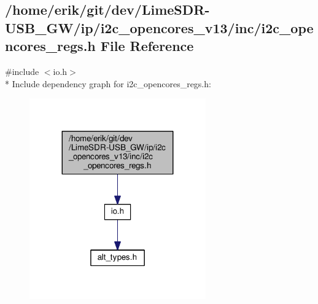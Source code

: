 \subsection{/home/erik/git/dev/\+Lime\+S\+D\+R-\/\+U\+S\+B\+\_\+\+G\+W/ip/i2c\+\_\+opencores\+\_\+v13/inc/i2c\+\_\+opencores\+\_\+regs.h File Reference}
\label{ip_2i2c__opencores__v13_2inc_2i2c__opencores__regs_8h}
{\ttfamily \#include $<$io.\+h$>$}\\*
Include dependency graph for i2c\+\_\+opencores\+\_\+regs.\+h\+:
\nopagebreak
\begin{figure}[H]
\begin{center}
\leavevmode
\includegraphics[width=215pt]{d4/d09/ip_2i2c__opencores__v13_2inc_2i2c__opencores__regs_8h__incl}
\end{center}
\end{figure}
